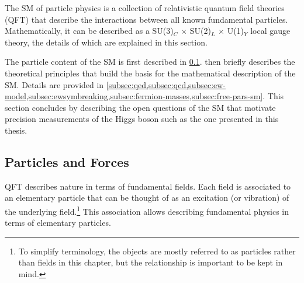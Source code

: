 

The SM of particle physics is a collection of relativistic quantum field theories (QFT) that describe the interactions between all known fundamental particles.
Mathematically, it can be described as a SU(3)$_C$ $\times$ SU(2)$_L$ $\times$ U(1)$_Y$ local gauge theory, the details of which are explained in this section.

The particle content of the SM is first described in \cref{subsec:particle-content}.  then briefly describes the theoretical principles that build the basis for the mathematical description of the SM. 
 Details are provided in \cref{subsec:qed,subsec:qcd,subsec:ew-model,subsec:ewsymbreaking,subsec:fermion-masses,subsec:free-pars-sm}. This section concludes by describing the open questions of the SM that motivate precision measurements of the Higgs boson such as the one presented in this thesis.






\subsection{Particles and Forces}
\label{subsec:particle-content}
QFT describes nature in terms of fundamental fields. Each field is associated to an elementary particle that can be thought of as an excitation (or vibration) of the underlying field.\footnote{To simplify terminology, the objects are mostly referred to as particles rather than fields in this chapter, but the relationship is important to be kept in mind.} This association allows describing fundamental physics in terms of elementary particles. 

